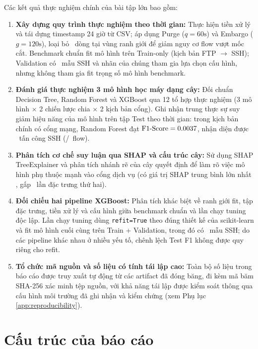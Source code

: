 Các kết quả thực nghiệm chính của bài tập lớn bao gồm:
\begin{enumerate}
    \item \textbf{Xây dựng quy trình thực nghiệm theo thời gian:} Thực hiện tiền xử lý và tái dựng timestamp 24 giờ từ CSV; áp dụng Purge ($q=60\text{s}$) và Embargo ($g=120\text{s}$), loại bỏ \DataPurgedRows\ dòng tại vùng ranh giới để giảm nguy cơ flow vượt mốc cắt. Benchmark chuẩn fit mô hình trên Train-only (kịch bản FTP $\to$ SSH); Validation có \DataValidationSSH\ mẫu SSH và nhãn của chúng tham gia lựa chọn cấu hình, nhưng không tham gia fit trọng số mô hình benchmark.
    \item \textbf{Đánh giá thực nghiệm 3 mô hình học máy dạng cây:} Đối chuẩn Decision Tree, Random Forest và XGBoost qua 12 tổ hợp thực nghiệm (3 mô hình $\times$ 2 chiến lược chia $\times$ 2 kịch bản cổng). Ghi nhận trung thực sự suy giảm hiệu năng của mô hình trên tập Test theo thời gian: trong kịch bản chính có cổng mạng, Random Forest đạt $\text{F1-Score} = 0.0037$, nhận diện được \RFTestSSHRecall\ tấn công SSH (\RFTestTP/\DataTestSSH\ flow).
    \item \textbf{Phân tích cơ chế suy luận qua SHAP và cấu trúc cây:} Sử dụng SHAP TreeExplainer và phân tích nhánh rẽ của cây quyết định để làm rõ việc mô hình phụ thuộc mạnh vào cổng dịch vụ (có giá trị SHAP trung bình lớn nhất \SHAPTopOneVal, gấp \SHAPRatioTopOneTwo\ lần đặc trưng thứ hai).
    \item \textbf{Đối chiếu hai pipeline XGBoost:} Phân tích khác biệt về ranh giới fit, tập đặc trưng, tiền xử lý và cấu hình giữa benchmark chuẩn và lần chạy tuning độc lập. Lần chạy tuning dùng \texttt{refit=True} theo đúng thiết kế của scikit-learn và fit mô hình cuối cùng trên Train + Validation, trong đó có \DataValidationSSH\ mẫu SSH; do các pipeline khác nhau ở nhiều yếu tố, chênh lệch Test F1 không được quy riêng cho refit.
    \item \textbf{Tổ chức mã nguồn và số liệu có tính tái lập cao:} Toàn bộ số liệu trong báo cáo được truy xuất tự động từ các artifact đã đóng băng, đi kèm mã băm SHA-256 xác minh tệp nguồn, với khả năng tái lập được kiểm soát thông qua cấu hình môi trường đã ghi nhận và kiểm chứng (xem Phụ lục \ref{app:reproducibility}).
\end{enumerate}

\section{Cấu trúc của báo cáo}

